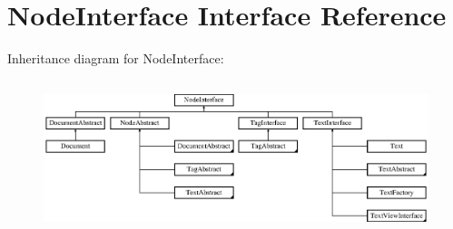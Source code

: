 \hypertarget{interface_pes_1_1_dom_1_1_node_1_1_node_interface}{}\section{Node\+Interface Interface Reference}
\label{interface_pes_1_1_dom_1_1_node_1_1_node_interface}
Inheritance diagram for Node\+Interface\+:\begin{figure}[H]
\begin{center}
\leavevmode
\includegraphics[height=4.552845cm]{interface_pes_1_1_dom_1_1_node_1_1_node_interface}
\end{center}
\end{figure}
